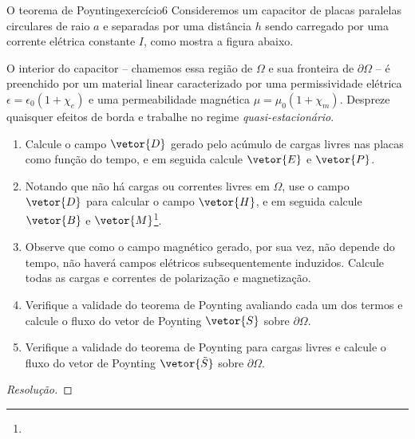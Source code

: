 \begin{exercício}{O teorema de Poynting}{exercício6}
    Consideremos um capacitor de placas paralelas circulares de raio \(a\) e separadas por uma distância \(h\) sendo carregado por uma corrente elétrica constante \(I\), como mostra a figura abaixo.
    \begin{center}
        \todo[tikz]
    \end{center}
    O interior do capacitor -- chamemos essa região de \(\Omega\) e sua fronteira de \(\partial \Omega\) -- é preenchido por um material linear caracterizado por uma permissividade elétrica \(\epsilon = \epsilon_0 (1 + \chi_e)\) e uma permeabilidade magnética \(\mu = \mu_0 (1 + \chi_m)\). Despreze quaisquer efeitos de borda e trabalhe no regime \emph{quasi-estacionário}.
    \begin{enumerate}[label=(\alph*)]
        \item Calcule o campo \(\vetor{D}\) gerado pelo acúmulo de cargas livres nas placas como função do tempo, e em seguida calcule \(\vetor{E}\) e \(\vetor{P}\).
        \item Notando que não há cargas ou correntes livres em \(\Omega\), use o campo \(\vetor{D}\) para calcular o campo \(\vetor{H}\), e em seguida calcule \(\vetor{B}\) e \(\vetor{M}\)\footnote{}.
        \item Observe que como o campo magnético gerado, por sua vez, não depende do tempo, não haverá campos elétricos subsequentemente induzidos. Calcule todas as cargas e correntes de polarização e magnetização. \todo[(incluindo Jp)]
        \item Verifique a validade do teorema de Poynting avaliando cada um dos termos e calcule o fluxo do vetor de Poynting \(\vetor{S}\) sobre \(\partial \Omega\).
        \item Verifique a validade do teorema de Poynting para cargas livres e calcule o fluxo do vetor de Poynting \(\vetor{\tilde{S}}\) sobre \(\partial \Omega\).
    \end{enumerate}
\end{exercício}
\begin{proof}[Resolução]

\end{proof}
